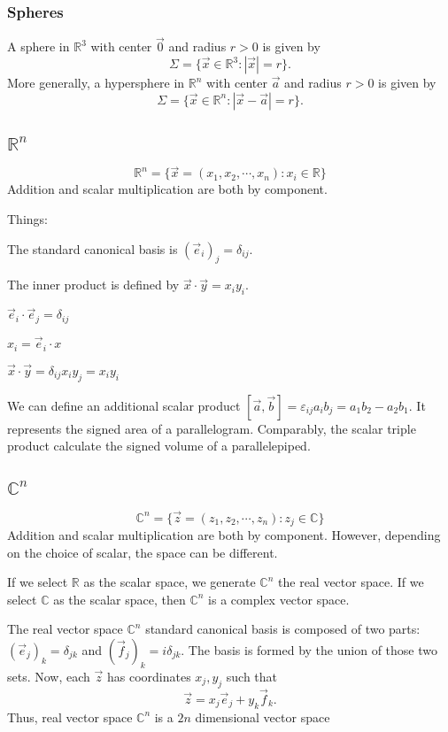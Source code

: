 \documentclass[12pt]{article}
\begin{document}
\subsubsection*{Spheres}

A sphere in $\mathbb{R}^{3}$ with center $\vec{0}$ and radius $r > 0$
is given by
\[
\Sigma = \{\vec{x} \in \mathbb{R}^{3} : |\vec{x}| = r\}.
\]
More generally, a hypersphere in $\mathbb{R}^{n}$ with center $\vec{a}$
and radius $r > 0$ is given by
\[
\Sigma = \{\vec{x} \in \mathbb{R}^{n} : |\vec{x} - \vec{a}| = r\}.
\]
\subsection[R n]{$\mathbb{R}^{n}$}
\[
\mathbb{R}^{n} = \{\vec{x} = (x_{1},x_{2},\cdots,x_n) : x_i \in \mathbb{R}\}
\]
Addition and scalar multiplication are both by component.

Things:
\begin{compactenum}[(i)]
\item The standard canonical basis is $(\vec{e}_i)_j = \delta_{ij}$.
\item The inner product is defined by $\vec{x}\cdot\vec{y} = x_iy_i$.
\item $\vec{e}_i \cdot \vec{e}_j = \delta_{ij}$
\item $x_i = \vec{e}_i \cdot x$
\item $\vec{x}\cdot\vec{y} = \delta_{ij}x_iy_j = x_iy_i$
\item We can define an additional scalar product $[\vec{a},\vec{b}] = \varepsilon_{ij}a_ib_j = a_{1}b_{2}-a_{2}b_{1}$.
    It represents the signed area of a parallelogram.
    Comparably, the scalar triple product calculate the signed volume
    of a parallelepiped.
\end{compactenum}

\subsection[C n]{$\mathbb{C}^{n}$}
\[
\mathbb{C}^{n} = \{\vec{z} = (z_{1},z_{2},\cdots,z_n) : z_j \in \mathbb{C}\}
\]
Addition and scalar multiplication are both by component.
However, depending on the choice of scalar,
the space can be different.

If we select $\mathbb{R}$ as the scalar space,
we generate $\mathbb{C}^{n}$ the real vector space.
If we select $\mathbb{C}$ as the scalar space,
then $\mathbb{C}^{n}$ is a complex vector space.

The real vector space $\mathbb{C}^{n}$ standard
canonical basis is composed of two parts:
$(\vec{e}_j)_k = \delta_{jk}$ and 
$(\vec{f}_j)_k = i\delta_{jk}$. 
The basis is formed by the union of those two sets.
Now, each $\vec{z}$ has coordinates $x_j,y_j$ such that
\[
\vec{z} = x_j \vec{e}_j + y_k \vec{f}_k.
\]
Thus, real vector space $\mathbb{C}^{n}$ is a $2n$ dimensional vector space
\end{document}

